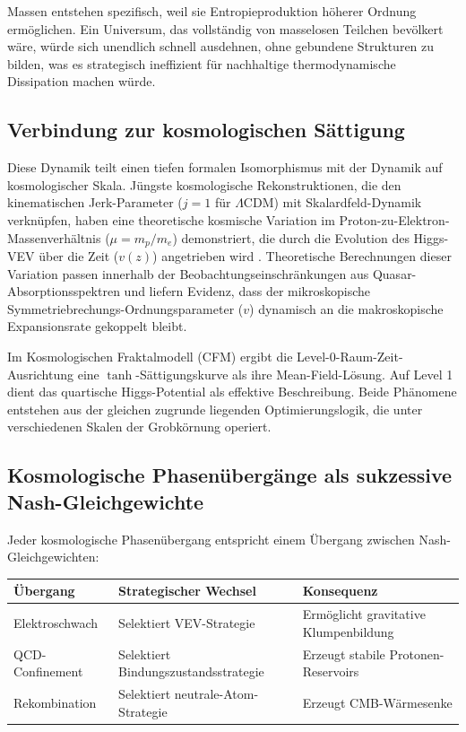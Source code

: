 \documentclass[12pt,a4paper]{article}
\theoremstyle{remark}
\begin{document}
Massen entstehen spezifisch, weil sie Entropieproduktion h\"oherer Ordnung erm\"oglichen. Ein Universum, das vollst\"andig von masselosen Teilchen bev\"olkert w\"are, w\"urde sich unendlich schnell ausdehnen, ohne gebundene Strukturen zu bilden, was es strategisch ineffizient f\"ur nachhaltige thermodynamische Dissipation machen w\"urde.

\subsection{Verbindung zur kosmologischen S\"attigung}

Diese Dynamik teilt einen tiefen formalen Isomorphismus mit der Dynamik auf kosmologischer Skala. J\"ungste kosmologische Rekonstruktionen, die den kinematischen Jerk-Parameter ($j = 1$ f\"ur $\Lambda$CDM) mit Skalardfeld-Dynamik verkn\"upfen, haben eine theoretische kosmische Variation im Proton-zu-Elektron-Massenverh\"altnis ($\mu = m_p/m_e$) demonstriert, die durch die Evolution des Higgs-VEV \"uber die Zeit ($v(z)$) angetrieben wird \citep{HiggsVEV2024}. Theoretische Berechnungen dieser Variation passen innerhalb der Beobachtungseinschr\"ankungen aus Quasar-Absorptionsspektren und liefern Evidenz, dass der mikroskopische Symmetriebrechungs-Ordnungsparameter ($v$) dynamisch an die makroskopische Expansionsrate gekoppelt bleibt.

Im Kosmologischen Fraktalmodell (CFM) ergibt die Level-0-Raum-Zeit-Ausrichtung eine $\tanh$-S\"attigungskurve als ihre Mean-Field-L\"osung. Auf Level 1 dient das quartische Higgs-Potential als effektive Beschreibung. Beide Ph\"anomene entstehen aus der gleichen zugrunde liegenden Optimierungslogik, die unter verschiedenen Skalen der Grobk\"ornung operiert.

\subsection{Kosmologische Phasen\"uberg\"ange als sukzessive Nash-Gleichgewichte}

Jeder kosmologische Phasen\"ubergang entspricht einem \"Ubergang zwischen Nash-Gleichgewichten:

\begin{center}
\begin{tabular}{lll}
\toprule
\textbf{\"Ubergang} & \textbf{Strategischer Wechsel} & \textbf{Konsequenz} \\
\midrule
Elektroschwach & Selektiert VEV-Strategie & Erm\"oglicht gravitative Klumpenbildung \\
QCD-Confinement & Selektiert Bindungszustandsstrategie & Erzeugt stabile Protonen-Reservoirs \\
Rekombination & Selektiert neutrale-Atom-Strategie & Erzeugt CMB-W\"armesenke \\
\bottomrule
\end{tabular}
\end{center}
\end{document}
